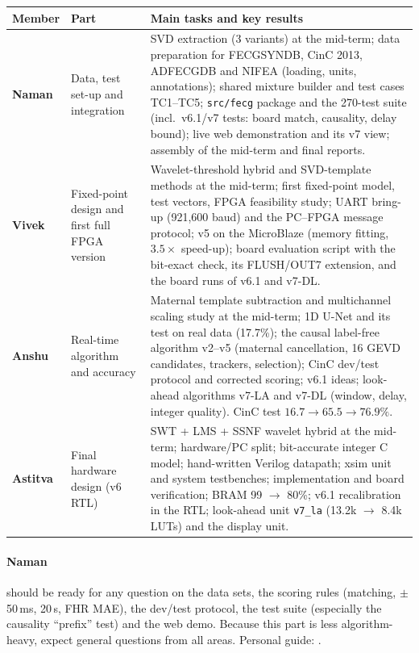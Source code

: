 \documentclass[11pt]{article}
\newcommand{\ttt}[1]{\texttt{#1}}
\renewcommand{\file}[1]{\path{#1}}
\begin{document}
\begin{center}
\small
\begin{tabularx}{\linewidth}{@{}l p{2.6cm} X@{}}
\toprule
\textbf{Member} & \textbf{Part} & \textbf{Main tasks and key results} \\
\midrule
\textbf{Naman} & Data, test set-up and integration & SVD extraction (3 variants) at the mid-term; data preparation for FECGSYNDB, CinC 2013, ADFECGDB and NIFEA (loading, units, annotations); shared mixture builder and test cases TC1--TC5; \ttt{src/fecg} package and the 270-test suite (incl.\ v6.1/v7 tests: board match, causality, delay bound); live web demonstration and its v7 view; assembly of the mid-term and final reports. \\
\textbf{Vivek} & Fixed-point design and first full FPGA version & Wavelet-threshold hybrid and SVD-template methods at the mid-term; first fixed-point model, test vectors, FPGA feasibility study; UART bring-up (921,600 baud) and the PC--FPGA message protocol; v5 on the MicroBlaze (memory fitting, $3.5\times$ speed-up); board evaluation script with the bit-exact check, its FLUSH/OUT7 extension, and the board runs of v6.1 and v7-DL. \\
\textbf{Anshu} & Real-time algorithm and accuracy & Maternal template subtraction and multichannel scaling study at the mid-term; 1D U-Net and its test on real data (17.7\%); the causal label-free algorithm v2--v5 (maternal cancellation, 16 GEVD candidates, trackers, selection); CinC dev/test protocol and corrected scoring; v6.1 ideas; look-ahead algorithms v7-LA and v7-DL (window, delay, integer quality). CinC test $16.7 \to 65.5 \to 76.9\%$. \\
\textbf{Astitva} & Final hardware design (v6 RTL) & SWT + LMS + SSNF wavelet hybrid at the mid-term; hardware/PC split; bit-accurate integer C model; hand-written Verilog datapath; xsim unit and system testbenches; implementation and board verification; BRAM 99 $\to$ 80\%; v6.1 recalibration in the RTL; look-ahead unit \ttt{v7\_la} (13.2k $\to$ 8.4k LUTs) and the display unit. \\
\bottomrule
\end{tabularx}
\end{center}

\paragraph{Naman} should be ready for any question on the data sets, the scoring rules (matching, $\pm$50\,ms, 20\,s, FHR MAE), the dev/test protocol, the test suite (especially the causality ``prefix'' test) and the web demo. Because this part is less algorithm-heavy, expect general questions from all areas. Personal guide: \file{team/pdf/01_Naman.pdf}.
\end{document}
